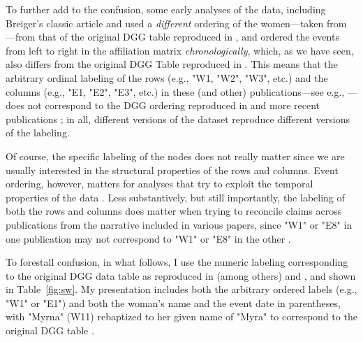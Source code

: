 \documentclass[a4paper,fleqn]{cas-sc}
\begin{document}
To further add to the confusion, some early analyses of the data, including Breiger's \citeyearpar{breiger1974duality} classic article and \citet{doreian1979evolution} used a \textit{different} ordering of the women---taken from \citet[83]{homans1950human}---from that of the original DGG table reproduced in \citet{freeman2003finding}, and ordered the events from left to right in the affiliation matrix \textit{chronologically}, which, as we have seen, also differs from the original DGG Table reproduced in \citet{freeman2003finding}. This means that the arbitrary ordinal labeling of the rows (e.g., "W1, "W2", "W3", etc.) and the columns (e.g., "E1, "E2", "E3", etc.) in these (and other) publications---see e.g., \citep[table 1]{doreian1979evolution}---does not correspond to the DGG ordering reproduced in \citet{freeman2003finding} and more recent publications \citep[e.g.,][]{borgatti2014analyzing, batagelj2022analysis}; in all, different versions of the dataset reproduce different versions of the labeling. 

Of course, the specific labeling of the nodes does not really matter since we are usually interested in the structural properties of the rows and columns. Event ordering, however, matters for analyses that try to exploit the temporal properties of the data \citep[e.g.,][]{everett2018measuring, lerner2022dynamic}. Less substantively, but still importantly, the labeling of both the rows and columns does matter when trying to reconcile claims across publications from the narrative included in various papers, since "W1" or "E8" in one publication \citep[e.g.,][]{freeman2003finding} may not correspond to "W1" or "E8" in the other \citep[e.g.,][]{doreian1979evolution}. 

To forestall confusion, in what follows, I use the numeric labeling corresponding to the original DGG data table as reproduced in (among others) \citet[Figure 1]{freeman2003finding} and \citet[Figure 28.1]{borgatti2014analyzing}, and shown in Table~\ref{fig:sw}. My presentation includes both the arbitrary ordered labels (e.g., "W1" or "E1") and both the woman's name and the event date in parentheses, with "Myrna" (W11) rebaptized to her given name of "Myra" to correspond to the original DGG table \citep{freeman2003finding, batagelj2022analysis}.
\end{document}
